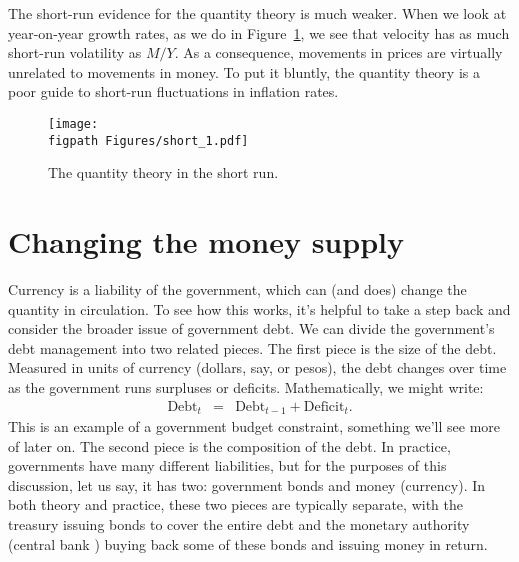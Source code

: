 The short-run evidence for the quantity theory is much weaker.
When we look at year-on-year growth rates,
as we do in Figure~\ref{fig:quantity_short},
we see that velocity has as much short-run volatility as $M/Y$.
As a consequence,
movements in prices are virtually unrelated to movements in money.
To put it bluntly, the quantity theory is a poor guide to short-run fluctuations
in inflation rates.


\begin{figure}[ht]
    \caption{The quantity theory in the short run.}
    \label{fig:quantity_short}
    \centering
    \texttt{[image: \\figpath Figures/short\_1.pdf]}
\end{figure}



\section{Changing the money supply}

Currency is a liability of the government,
which can (and does) change the quantity in circulation.
To see how this works, it's helpful to take a
step back and consider the broader issue of government debt.
We can divide the government's debt management into two
related pieces.
The first piece is the size of the debt.
Measured in units of currency (dollars, say, or pesos),
the debt changes over time as the government runs surpluses
or deficits.
Mathematically, we might write:
\begin{eqnarray*}
    \mbox{Debt}_{t} &=& \mbox{Debt}_{t-1} + \mbox{Deficit}_t .
\end{eqnarray*}
This is an example of a government budget constraint, something
we'll see more of later on.
The second piece is the composition of the debt.
In practice, governments have many different liabilities,
but for the purposes of this discussion, let us say, it has two:
government bonds  and money (currency).
In both theory and practice,
these two pieces are typically separate,
with the treasury issuing bonds  to cover the entire debt
and the monetary authority (central bank ) buying back
some of these bonds  and issuing money in return.

